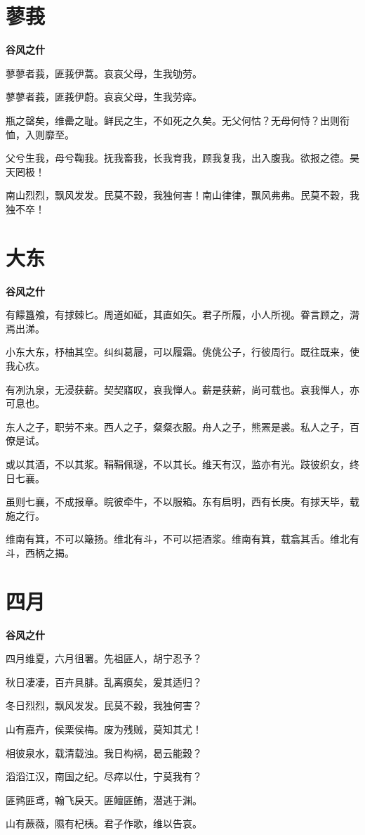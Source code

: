 \documentclass[12pt,a4paper]{ctexbook}
\begin{document}
\section{蓼莪}
\textbf{谷风之什}\par\vspace{0.5em}
蓼蓼者莪，匪莪伊蒿。哀哀父母，生我劬劳。\par
蓼蓼者莪，匪莪伊蔚。哀哀父母，生我劳瘁。\par
瓶之罄矣，维罍之耻。鲜民之生，不如死之久矣。无父何怙？无母何恃？出则衔恤，入则靡至。\par
父兮生我，母兮鞠我。抚我畜我，长我育我，顾我复我，出入腹我。欲报之德。昊天罔极！\par
南山烈烈，飘风发发。民莫不穀，我独何害！南山律律，飘风弗弗。民莫不穀，我独不卒！\par

\section{大东}
\textbf{谷风之什}\par\vspace{0.5em}
有饛簋飧，有捄棘匕。周道如砥，其直如矢。君子所履，小人所视。眷言顾之，潸焉出涕。\par
小东大东，杼柚其空。纠纠葛屦，可以履霜。佻佻公子，行彼周行。既往既来，使我心疚。\par
有冽氿泉，无浸获薪。契契寤叹，哀我惮人。薪是获薪，尚可载也。哀我惮人，亦可息也。\par
东人之子，职劳不来。西人之子，粲粲衣服。舟人之子，熊罴是裘。私人之子，百僚是试。\par
或以其酒，不以其浆。鞙鞙佩璲，不以其长。维天有汉，监亦有光。跂彼织女，终日七襄。\par
虽则七襄，不成报章。睆彼牵牛，不以服箱。东有启明，西有长庚。有捄天毕，载施之行。\par
维南有箕，不可以簸扬。维北有斗，不可以挹酒浆。维南有箕，载翕其舌。维北有斗，西柄之揭。\par

\section{四月}
\textbf{谷风之什}\par\vspace{0.5em}
四月维夏，六月徂署。先祖匪人，胡宁忍予？\par
秋日凄凄，百卉具腓。乱离瘼矣，爰其适归？\par
冬日烈烈，飘风发发。民莫不穀，我独何害？\par
山有嘉卉，侯栗侯梅。废为残贼，莫知其尤！\par
相彼泉水，载清载浊。我日构祸，曷云能穀？\par
滔滔江汉，南国之纪。尽瘁以仕，宁莫我有？\par
匪鹑匪鸢，翰飞戾天。匪鳣匪鲔，潜逃于渊。\par
山有蕨薇，隰有杞桋。君子作歌，维以告哀。\par
\end{document}
